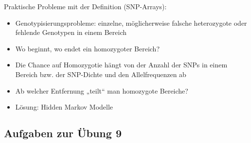 Praktische Probleme mit der Definition (SNP-Arrays):
\begin{itemize}
	\item Genotypisierungsprobleme: einzelne, möglicherweise falsche heterozygote oder fehlende Genotypen in einem Bereich
	\item Wo beginnt, wo endet ein homozygoter Bereich?
	\item Die Chance auf Homozygotie hängt von der Anzahl der SNPs in einem Bereich bzw. der SNP-Dichte und den Allelfrequenzen ab
	\item Ab welcher Entfernung „teilt“ man homozygote Bereiche?
	\item Lösung: Hidden Markov Modelle
\end{itemize}

\subsection{Aufgaben zur Übung 9}
